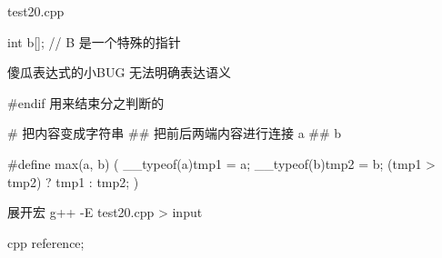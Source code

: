 test20.cpp

int b[];  // B 是一个特殊的指针

傻瓜表达式的小BUG   无法明确表达语义

#endif 用来结束分之判断的

# 把内容变成字符串
## 把前后两端内容进行连接   a ## b

#define max(a, b) ({
    __typeof(a)tmp1 = a;
    __typeof(b)tmp2 = b;
    (tmp1 > tmp2) ? tmp1 : tmp2;
})

展开宏  g++ -E test20.cpp > input

cpp reference;

